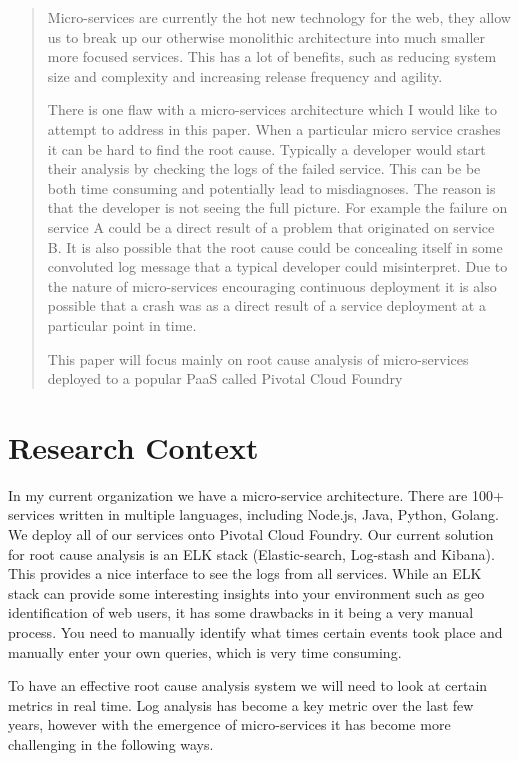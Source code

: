 \begin{abstract}
Micro-services are currently the hot new technology for the web, they allow us to break up our otherwise monolithic architecture into much smaller more focused services. This has a lot of benefits, such as reducing system size and complexity and increasing release frequency and agility. 

There is one flaw with a micro-services architecture which I would like to attempt to address in this paper. When a particular micro service crashes it can be hard to find the root cause. Typically a developer would start their analysis by checking the logs of the failed service. This can be be both time consuming and potentially lead to misdiagnoses. The reason is that the developer is not seeing the full picture. For example the failure on service A could be a direct result of a problem that originated on service B. It is also possible that the root cause could be concealing itself in some convoluted log message that a typical developer could misinterpret. Due to the nature of micro-services encouraging continuous deployment it is also possible that a crash was as a direct result of a service deployment at a particular point in time. 

This paper will focus mainly on root cause analysis of micro-services deployed to a popular PaaS called Pivotal Cloud Foundry

\end{abstract}

\chapter{Research Context}
In my current organization we have a micro-service architecture. There are 100+ services written in multiple languages, including Node.js, Java, Python, Golang. We deploy all of our services onto Pivotal Cloud Foundry. Our current solution for root cause analysis is an ELK stack (Elastic-search, Log-stash and Kibana). This provides a nice interface to see the logs from all services. While an ELK stack can provide some interesting insights into your environment such as geo identification of web users\cite{7508191}, it has some drawbacks in it being a very manual process. You need to manually identify what times certain events took place and manually enter your own queries, which is very time consuming.

To have an effective root cause analysis system we will need to look at certain metrics in real time. Log analysis has become a key metric over the last few years, however with the emergence of micro-services it has become more challenging in the following ways.

